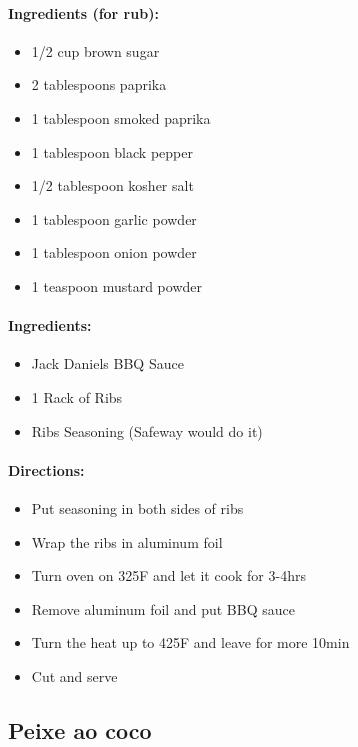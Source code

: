 \documentclass{article}
\begin{document}
\paragraph{Ingredients (for rub):}

\begin{itemize}
\item 1/2 cup brown sugar
\item 2 tablespoons paprika
\item 1 tablespoon smoked paprika
\item 1 tablespoon black pepper
\item 1/2 tablespoon kosher salt
\item 1 tablespoon garlic powder
\item 1 tablespoon onion powder
\item 1 teaspoon mustard powder
\end{itemize}

\paragraph{Ingredients:}

\begin{itemize}
\item Jack Daniels BBQ Sauce 
\item 1 Rack of Ribs 
\item Ribs Seasoning (Safeway would do it)
\end{itemize}

\paragraph{Directions:}
\begin{itemize}
\item Put seasoning in both sides of ribs 
\item Wrap the ribs in aluminum foil 
\item Turn oven on 325F and let it cook for 3-4hrs 
\item Remove aluminum foil and put BBQ sauce 
\item Turn the heat up to 425F and leave for more 10min 
\item Cut and serve
\end{itemize}

\subsection{Peixe ao coco}
\end{document}
